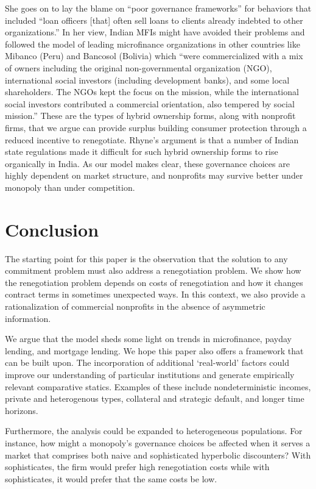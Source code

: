 \documentclass[11pt,english]{article}
\theoremstyle{plain}
\theoremstyle{definition}
\begin{document}
She goes on to lay the blame on ``poor governance frameworks\textquotedblright{}
for behaviors that included ``loan officers {[}that{]} often sell
loans to clients already indebted to other organizations.'' In her
view, Indian MFIs might have avoided their problems and followed the
model of leading microfinance organizations in other countries like
Mibanco (Peru) and Bancosol (Bolivia) which ``were commercialized
with a mix of owners including the original non-governmental organization
(NGO), international social investors (including development banks),
and some local shareholders. The NGOs kept the focus on the mission,
while the international social investors contributed a commercial
orientation, also tempered by social mission.'' These are the types
of hybrid ownership forms, along with nonprofit firms, that we argue
can provide surplus building consumer protection through a reduced
incentive to renegotiate. Rhyne's argument is that a number of Indian
state regulations made it difficult for such hybrid ownership forms
to rise organically in India. As our model makes clear, these governance
choices are highly dependent on market structure, and nonprofits may
survive better under monopoly than under competition.

\section{Conclusion}

The starting point for this paper is the observation that the solution
to any commitment problem must also address a renegotiation problem.
We show how the renegotiation problem depends on costs of renegotiation
and how it changes contract terms in sometimes unexpected ways. In
this context, we also provide a rationalization of commercial nonprofits
in the absence of asymmetric information.

We argue that the model sheds some light on trends in microfinance,
payday lending, and mortgage lending. We hope this paper also offers
a framework that can be built upon. The incorporation of additional
`real-world' factors could improve our understanding of particular
institutions and generate empirically relevant comparative statics.
Examples of these include nondeterministic incomes, private and heterogenous
types, collateral and strategic default, and longer time horizons.

Furthermore, the analysis could be expanded to heterogeneous populations.
For instance, how might a monopoly's governance choices be affected
when it serves a market that comprises both naive and sophisticated
hyperbolic discounters? With sophisticates, the firm would prefer
high renegotiation costs while with sophisticates, it would prefer
that the same costs be low.
\end{document}
